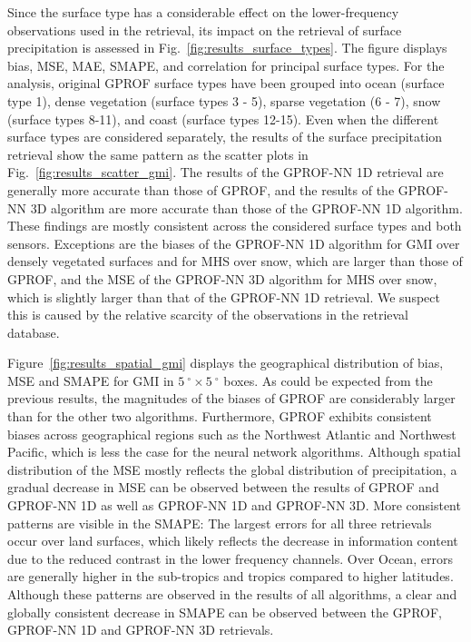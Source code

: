 \documentclass[journal abbreviation, manuscript]{copernicus}
\begin{document}
Since the surface type has a considerable effect on the lower-frequency observations used in the retrieval, its impact on the retrieval of surface precipitation is assessed in Fig.~\ref{fig:results_surface_types}. The figure displays bias, MSE, MAE, SMAPE, and correlation for principal surface types. For the analysis, original GPROF surface types have been grouped into ocean (surface type 1), dense vegetation (surface types 3 - 5), sparse vegetation (6 - 7), snow (surface types 8-11), and coast (surface types 12-15). Even when the different surface types are considered separately, the results of the surface precipitation retrieval show the same pattern as the scatter plots in Fig.~\ref{fig:results_scatter_gmi}. The results of the GPROF-NN 1D retrieval are generally more accurate than those of GPROF, and the results of the GPROF-NN 3D algorithm are more accurate than those of the GPROF-NN 1D algorithm. These findings are mostly consistent across the considered surface types and both sensors. Exceptions are the biases of the GPROF-NN 1D algorithm for GMI over densely vegetated surfaces and for MHS over snow, which are larger than those of GPROF, and the MSE of the GPROF-NN 3D algorithm for MHS over snow, which is slightly larger than that of the GPROF-NN 1D retrieval. We suspect this is caused by the relative scarcity of the observations in the retrieval database.

Figure~\ref{fig:results_spatial_gmi} displays the geographical distribution of
bias, MSE and SMAPE for GMI in $5\ \unit{^{\circ}} \times 5\ \unit{^{\circ}}$
boxes. As could be expected from the previous results, the magnitudes of the
biases of GPROF are considerably larger than for the other two algorithms.
Furthermore, GPROF exhibits consistent biases across geographical regions such
as the Northwest Atlantic and Northwest Pacific, which is less the case for the
neural network algorithms. Although spatial distribution of the MSE mostly
reflects the global distribution of precipitation, a gradual decrease in MSE can
be observed between the results of GPROF and GPROF-NN 1D as well as GPROF-NN 1D
and GPROF-NN 3D. More consistent patterns are visible in the SMAPE: The largest
errors for all three retrievals occur over land surfaces, which likely reflects
the decrease in information content due to the reduced contrast in the lower
frequency channels. Over Ocean, errors are generally higher in the sub-tropics and
tropics compared to higher latitudes. Although these patterns are observed in
the results of all algorithms, a clear and globally consistent decrease in SMAPE
can be observed between the GPROF, GPROF-NN 1D and GPROF-NN 3D retrievals.
\end{document}
